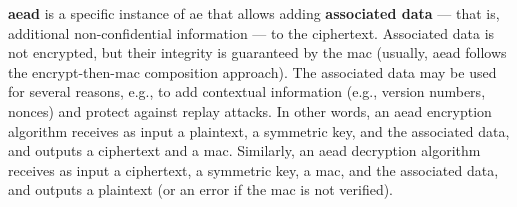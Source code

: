 \textbf{\gls{aead}} is a specific instance of \gls{ae} that allows adding \textbf{associated data} --- that is, additional non-confidential information --- to the ciphertext. Associated data is not encrypted, but their integrity is guaranteed by the \gls{mac} (usually, \gls{aead} follows the encrypt-then-\gls{mac} composition approach). The associated data may be used for several reasons, e.g., to add contextual information (e.g., version numbers, nonces) and protect against replay attacks. In other words, an \gls{aead} encryption algorithm receives as input a plaintext, a symmetric key, and the associated data, and outputs a ciphertext and a \gls{mac}. Similarly, an \gls{aead} decryption algorithm receives as input a ciphertext, a symmetric key, a \gls{mac}, and the associated data, and outputs a plaintext (or an error if the \gls{mac} is not verified).

